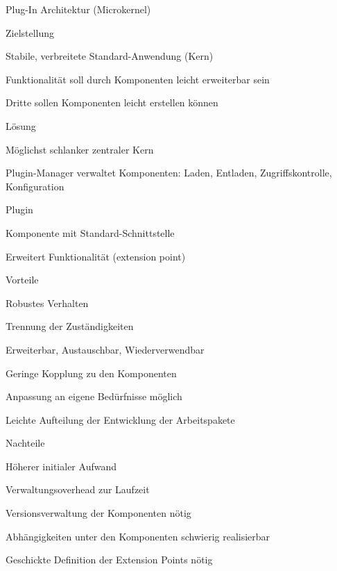 \documentclass[a4paper]{article}
\begin{document}
\begin{multicols}{3}
  Plug-In Architektur (Microkernel)
  \begin{itemize*}
    \item Zielstellung
          \begin{itemize*}
            \item Stabile, verbreitete Standard-Anwendung (Kern)
            \item Funktionalität soll durch Komponenten leicht erweiterbar sein
            \item Dritte sollen Komponenten leicht erstellen können
          \end{itemize*}
    \item Lösung
          \begin{itemize*}
            \item Möglichst schlanker zentraler Kern
            \item Plugin-Manager verwaltet Komponenten: Laden, Entladen, Zugriffskontrolle, Konfiguration
          \end{itemize*}
    \item Plugin
          \begin{itemize*}
            \item Komponente mit Standard-Schnittstelle
            \item Erweitert Funktionalität (extension point)
          \end{itemize*}
    \item Vorteile
          \begin{itemize*}
            \item Robustes Verhalten
            \item Trennung der Zuständigkeiten
            \item Erweiterbar, Austauschbar, Wiederverwendbar
            \item Geringe Kopplung zu den Komponenten
            \item Anpassung an eigene Bedürfnisse möglich
            \item Leichte Aufteilung der Entwicklung der Arbeitspakete
          \end{itemize*}
    \item Nachteile
          \begin{itemize*}
            \item Höherer initialer Aufwand
            \item Verwaltungsoverhead zur Laufzeit
            \item Versionsverwaltung der Komponenten nötig
            \item Abhängigkeiten unter den Komponenten schwierig realisierbar
            \item Geschickte Definition der Extension Points nötig
          \end{itemize*}
  \end{itemize*}


\end{multicols}
\end{document}
